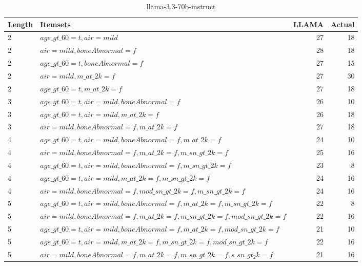 \documentclass[12pt]{article}
\begin{document}
\begin{table}[H]
    \centering
    \begin{adjustbox}{angle=90}

    \begin{tabular}{|l|l|r|r|}
    \hline
        Length & Itemsets & LLAMA & Actual\\
            \hline
        2 &  $age\_gt\_60=t, air=mild$ & 27 &\color{red}18 \\
        \hline
        2 & $air=mild, boneAbnormal=f$ & 28 & \color{red}18 \\
        \hline
        2 &  $age\_gt\_60=t, boneAbnormal=f$ & 27 &\color{red}15 \\
        \hline
        2 &  $air=mild, m\_at\_2k=f$ & 27 & 30 \\
        \hline
        2 &  $age\_gt\_60=t, m\_at\_2k=f$ & 27 & \color{red}18 \\
        \hline
        3 & $age\_gt\_60=t, air=mild, boneAbnormal=f$ & 26 & \color{red}10\\
        \hline
        3 & $age\_gt\_60=t, air=mild, m\_at\_2k=f$ & 26 & \color{red}18\\
        \hline
        3 & $air=mild, boneAbnormal=f, m\_at\_2k=f$ & 27 & \color{red}18\\
        \hline
        4 & $age\_gt\_60=t, air=mild, boneAbnormal=f, m\_at\_2k=f$ & 24 & \color{red}10\\
        \hline
        4 & $air=mild, boneAbnormal=f, m\_at\_2k=f, m\_sn\_gt\_2k=f$ & 25 & \color{red}16\\
        \hline
        4 & $age\_gt\_60=t, air=mild, boneAbnormal=f,  m\_sn\_gt\_2k=f$ & 23 & \color{red}8\\
        \hline
        4 & $age\_gt\_60=t, air=mild, m\_at\_2k=f,  m\_sn\_gt\_2k=f$ & 24 & \color{red}16\\
        \hline
        4 & $air=mild, boneAbnormal=f, mod\_sn\_gt\_2k = f,  m\_sn\_gt\_2k=f$ & 24 & \color{red}16\\
        \hline
        5 & $age\_gt\_60 = t, air = mild, boneAbnormal = f, m\_at\_2k = f, m\_sn\_gt\_2k = f$ & 22 &\color{red}8\\
        \hline
        5 & $air = mild, boneAbnormal = f, m\_at\_2k = f, m\_sn\_gt\_2k = f, mod\_sn\_gt\_2k = f$ & 22 &\color{red}16\\
        \hline
        5 & $age\_gt\_60 = t, air = mild, boneAbnormal = f, m\_at\_2k = f, mod\_sn\_gt\_2k = f$ & 21 &\color{red}10\\
        \hline
        5 & $age\_gt\_60 = t, air = mild, m\_at\_2k = f, m\_sn\_gt\_2k = f, mod\_sn\_gt\_2k = f$ & 22 &\color{red}16\\
        \hline
         5 & $air = mild, boneAbnormal = f, m\_at\_2k = f, m\_sn\_gt\_2k = f, s\_sn\_gt_2k = f$ & 21 &\color{red}16\\
         \hline
    \end{tabular}
    \end{adjustbox}
    \caption{llama-3.3-70b-instruct}
    \label{tab:my\_label}
\end{table}
\end{document}
